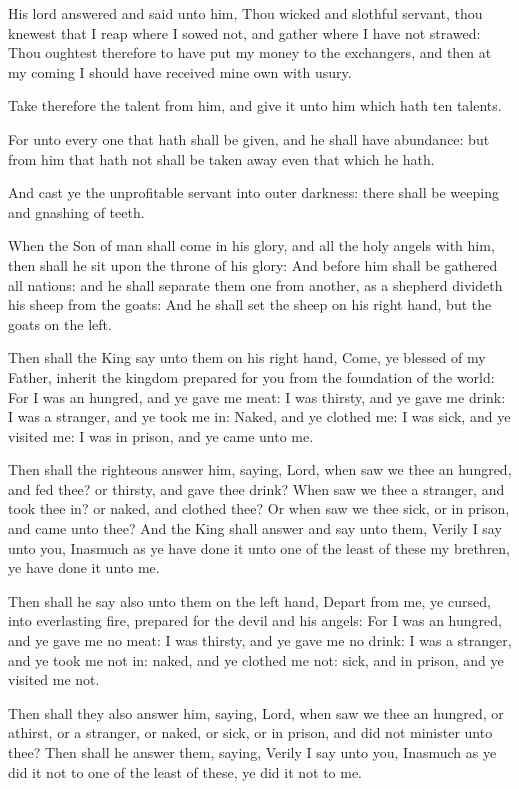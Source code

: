\verse His lord answered and said unto him, Thou wicked and slothful servant, thou knewest that I reap where I sowed not, and gather where I have not strawed: \verse Thou oughtest therefore to have put my money to the exchangers, and then at my coming I should have received mine own with usury.

\verse Take therefore the talent from him, and give it unto him which hath ten talents.

\verse For unto every one that hath shall be given, and he shall have abundance: but from him that hath not shall be taken away even that which he hath.

\verse And cast ye the unprofitable servant into outer darkness: there shall be weeping and gnashing of teeth.

\verse When the Son of man shall come in his glory, and all the holy angels with him, then shall he sit upon the throne of his glory: \verse And before him shall be gathered all nations: and he shall separate them one from another, as a shepherd divideth his sheep from the goats: \verse And he shall set the sheep on his right hand, but the goats on the left.

\verse Then shall the King say unto them on his right hand, Come, ye blessed of my Father, inherit the kingdom prepared for you from the foundation of the world: \verse For I was an hungred, and ye gave me meat: I was thirsty, and ye gave me drink: I was a stranger, and ye took me in: \verse Naked, and ye clothed me: I was sick, and ye visited me: I was in prison, and ye came unto me.

\verse Then shall the righteous answer him, saying, Lord, when saw we thee an hungred, and fed thee? or thirsty, and gave thee drink?  \verse When saw we thee a stranger, and took thee in? or naked, and clothed thee?  \verse Or when saw we thee sick, or in prison, and came unto thee?  \verse And the King shall answer and say unto them, Verily I say unto you, Inasmuch as ye have done it unto one of the least of these my brethren, ye have done it unto me.

\verse Then shall he say also unto them on the left hand, Depart from me, ye cursed, into everlasting fire, prepared for the devil and his angels: \verse For I was an hungred, and ye gave me no meat: I was thirsty, and ye gave me no drink: \verse I was a stranger, and ye took me not in: naked, and ye clothed me not: sick, and in prison, and ye visited me not.

\verse Then shall they also answer him, saying, Lord, when saw we thee an hungred, or athirst, or a stranger, or naked, or sick, or in prison, and did not minister unto thee?  \verse Then shall he answer them, saying, Verily I say unto you, Inasmuch as ye did it not to one of the least of these, ye did it not to me.

